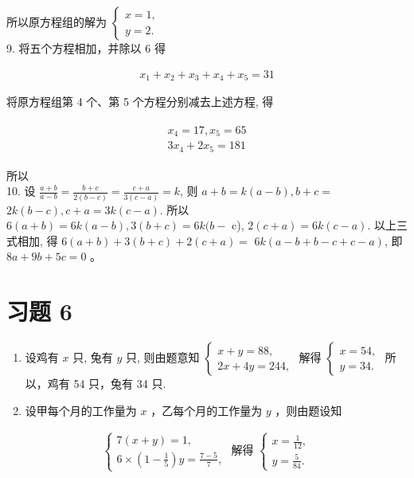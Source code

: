 \documentclass[10pt]{article}
\begin{document}
所以原方程组的解为 $\left\{\begin{array}{l}x=1, \\ y=2 .\end{array}\right.$\\
9. 将五个方程相加，并除以 6 得

\begin{align*}
x_{1}+x_{2}+x_{3}+x_{4}+x_{5}=31
\end{align*}

将原方程组第 4 个、第 5 个方程分别减去上述方程, 得

\begin{align*}
\begin{gathered}
x_{4}=17, x_{5}=65 \\
3 x_{4}+2 x_{5}=181
\end{gathered}
\end{align*}

所以\\
10. 设 $\frac{a+b}{a-b}=\frac{b+c}{2(b-c)}=\frac{c+a}{3(c-a)}=k$, 则 $a+b=k(a-b), b+c=$ $2 k(b-c), c+a=3 k(c-a)$. 所以 $6(a+b)=6 k(a-b), 3(b+c)=6 k(b-$ c), $2(c+a)=6 k(c-a)$. 以上三式相加, 得 $6(a+b)+3(b+c)+2(c+a)=$ $6 k(a-b+b-c+c-a)$, 即 $8 a+9 b+5 c=0$ 。

\section*{习题 6}
\begin{enumerate}
  \item 设鸡有 $x$ 只, 兔有 $y$ 只, 则由题意知 $\left\{\begin{array}{l}x+y=88, \\ 2 x+4 y=244,\end{array}\right.$ 解得 $\left\{\begin{array}{l}x=54, \\ y=34 .\end{array}\right.$ 所以，鸡有 54 只，兔有 34 只.
  \item 设甲每个月的工作量为 $x$ ，乙每个月的工作量为 $y$ ，则由题设知
\end{enumerate}

\begin{align*}
\left\{\begin{array} { l } 
{ 7 ( x + y ) = 1 , } \\
{ 6 \times ( 1 - \frac { 1 } { 5 } ) y = \frac { 7 - 5 } { 7 } , }
\end{array} \text { 解得 } \left\{\begin{array}{l}
x=\frac{1}{12}, \\
y=\frac{5}{84} .
\end{array}\right.\right.
\end{align*}
\end{document}
